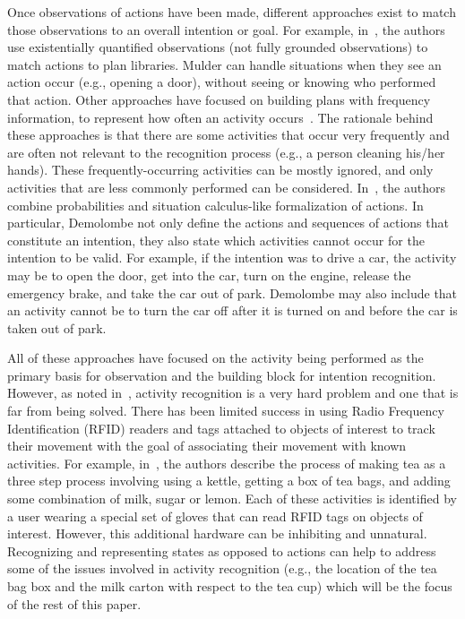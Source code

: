 \documentclass[preprint,12pt]{elsarticle}
\begin{document}
Once observations of actions have been made, different approaches exist to match those observations to an overall intention or goal. For example, in~\cite{MULDER.IF.2003}, the authors use existentially quantified observations (not fully grounded observations) to match actions to plan libraries. Mulder can handle situations when they see an action occur (e.g., opening a door), without seeing or knowing who performed that action. Other approaches have focused on building plans with frequency information, to represent how often an activity occurs~\cite{JARVIS.AIM.2005}. The rationale behind these approaches is that there are some activities that occur very frequently and are often not relevant to the recognition process (e.g., a person cleaning his/her hands). These frequently-occurring activities can be mostly ignored, and only activities that are less commonly performed can be considered. In~\cite{DEMOLOMBE.CLIMA.2005}, the authors combine probabilities and situation calculus-like formalization of actions. In particular, Demolombe not only define the actions and sequences of actions that constitute an intention, they also state which activities cannot occur for the intention to be valid. For example, if the intention was to drive a car, the activity may be to open the door, get into the car, turn on the engine, release the emergency brake, and take the car out of park. Demolombe may also include that an activity cannot be to turn the car off after it is turned on and before the car is taken out of park.

All of these approaches have focused on the activity being performed as the primary basis for observation and the building block for intention recognition. However, as noted in~\cite{SADRI.2011}, activity recognition is a very hard problem and one that is far from being solved. There has been limited success in using Radio Frequency Identification (RFID) readers and tags attached to objects of interest to track their movement with the goal of associating their movement with known activities. For example, in~\cite{Philipose.PC.2004}, the authors describe the process of making tea as a three step process involving using a kettle, getting a box of tea bags, and adding some combination of milk, sugar or lemon. Each of these activities is identified by a user wearing a special set of gloves that can read RFID tags on objects of interest. However, this additional hardware can be inhibiting and unnatural.  Recognizing and representing states as opposed to actions can help to address some of the issues involved in activity recognition (e.g., the location of the tea bag box and the milk carton with respect to the tea cup) which will be the focus of the rest of this paper.
\end{document}
